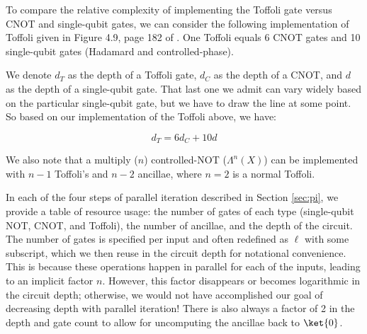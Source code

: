 To compare the relative complexity of implementing the Toffoli gate versus
CNOT and single-qubit gates, we can consider the following implementation
of Toffoli given in Figure 4.9, page 182 of \cite{nc00}. One Toffoli equals
6 CNOT gates and 10 single-qubit gates (Hadamard and controlled-phase).

We denote $d_T$ as the depth of a Toffoli gate, $d_C$ as the depth of a
CNOT, and $d$ as the depth of a single-qubit gate. That last one we admit
can vary widely based on the particular single-qubit gate, but we have to
draw the line at some point. So based on our implementation of the
Toffoli above, we have:

\begin{displaymath}
d_T = 6d_C + 10d
\end{displaymath}

We also note that a multiply ($n$) controlled-NOT ($\Lambda^n(X)$) can be
implemented with $n-1$ Toffoli's and $n-2$ ancillae, where $n=2$ is a
normal Toffoli.

In each of the four steps of parallel iteration described in Section
\ref{sec:pi}, we provide a table of resource usage: the number of gates
of each type (single-qubit NOT, CNOT, and Toffoli), the number of ancillae,
and the depth of the circuit. The number of gates is specified per input and
often redefined as $\ell$ with some subscript, which we then reuse in
the circuit depth for notational convenience. This is because
these operations happen in parallel for each of the inputs, leading to an
implicit factor $n$. However, this factor disappears or becomes logarithmic
in the circuit depth; otherwise, we would not have accomplished our goal
of decreasing depth with parallel iteration!
There is also always a factor of 2 in the depth
and gate count to allow for uncomputing the ancillae back to $\ket{0}$.
